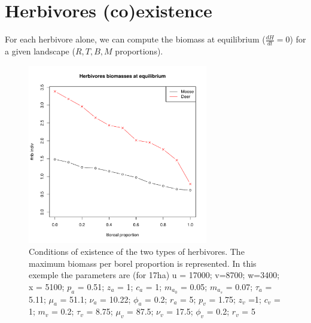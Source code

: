 



\newpage
\section{Herbivores (co)existence}

For each herbivore alone, we can compute the biomass at equilibrium ($\frac{dH}{dt}=0$) for a given landscape ($R, T, B, M$ proportions).

\begin{figure}
\includegraphics[width=0.7\textwidth]{../graphs/herbivore_eq_biomasses.pdf}
  \caption{Conditions of existence of the two types of herbivores. The maximum biomass per borel proportion is represented. In this exemple the parameters are (for 17ha) u = 17000; v=8700; w=3400; x = 5100; $p_a$ = 0.51; $z_a$ = 1; $c_a$ = 1; $m_{a_0}$ = 0.05; $m_{a_s}$ = 0.07; $\tau_a$ = 5.11; $\mu_a$ = 51.1; $\nu_a$ = 10.22; $\phi_a$ = 0.2; $r_a$ = 5; $p_v$ = 1.75; $z_v$ =1; $c_v$ = 1; $m_v$ = 0.2; $\tau_v$ = 8.75; $\mu_v$ = 87.5; $\nu_v$ = 17.5; $\phi_v$ = 0.2; $r_v$ = 5 }
\label{coexistenceH}
\end{figure}





